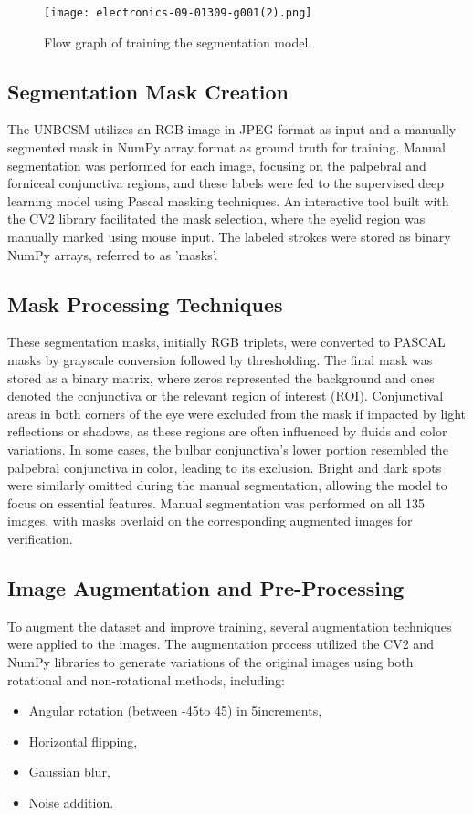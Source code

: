 \documentclass[conference]{IEEEtran}
\begin{document}
\begin{figure}[htbp]
\centerline{\texttt{[image: electronics-09-01309-g001(2).png]}}
\caption{Flow graph of training the segmentation model.}
\label{fig}
\end{figure}

\subsection{\textbf{Segmentation Mask Creation}}
The UNBCSM utilizes an RGB image in JPEG format as input and a manually segmented mask in NumPy array format as ground truth for training. Manual segmentation was performed for each image, focusing on the palpebral and forniceal conjunctiva regions, and these labels were fed to the supervised deep learning model using Pascal masking techniques. An interactive tool built with the CV2 library facilitated the mask selection, where the eyelid region was manually marked using mouse input. The labeled strokes were stored as binary NumPy arrays, referred to as 'masks'. 

\subsection{\textbf{Mask Processing Techniques}}
These segmentation masks, initially RGB triplets, were converted to PASCAL masks by grayscale conversion followed by thresholding. The final mask was stored as a binary matrix, where zeros represented the background and ones denoted the conjunctiva or the relevant region of interest (ROI). Conjunctival areas in both corners of the eye were excluded from the mask if impacted by light reflections or shadows, as these regions are often influenced by fluids and color variations. In some cases, the bulbar conjunctiva's lower portion resembled the palpebral conjunctiva in color, leading to its exclusion. Bright and dark spots were similarly omitted during the manual segmentation, allowing the model to focus on essential features. Manual segmentation was performed on all 135 images, with masks overlaid on the corresponding augmented images for verification.

\subsection{\textbf{Image Augmentation and Pre-Processing}}
To augment the dataset and improve training, several augmentation techniques were applied to the images. The augmentation process utilized the CV2 and NumPy libraries to generate variations of the original images using both rotational and non-rotational methods, including:
\begin{itemize}
    \item Angular rotation (between -45\degree to 45\degree) in 5\degree increments,
    \item Horizontal flipping,
    \item Gaussian blur,
    \item Noise addition.
\end{itemize}
\end{document}
